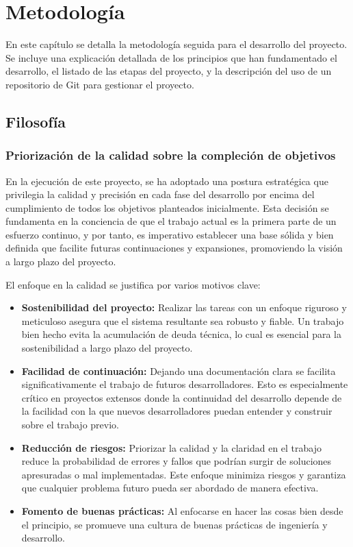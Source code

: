 \chapter{Metodología}

En este capítulo se detalla la metodología seguida para el desarrollo del proyecto. Se incluye una explicación detallada de los principios que han fundamentado el desarrollo, el listado de las etapas del proyecto, y la descripción del uso de un repositorio de Git para gestionar el proyecto.

\section{Filosofía}

\subsection{Priorización de la calidad sobre la compleción de objetivos}

En la ejecución de este proyecto, se ha adoptado una postura estratégica que privilegia la calidad y precisión en cada fase del desarrollo por encima del cumplimiento de todos los objetivos planteados inicialmente. Esta decisión se fundamenta en la conciencia de que el trabajo actual es la primera parte de un esfuerzo continuo, y por tanto, es imperativo establecer una base sólida y bien definida que facilite futuras continuaciones y expansiones, promoviendo la visión a largo plazo del proyecto.

El enfoque en la calidad se justifica por varios motivos clave:

\begin{itemize}
	\item \textbf{Sostenibilidad del proyecto:} Realizar las tareas con un enfoque riguroso y meticuloso asegura que el sistema resultante sea robusto y fiable. Un trabajo bien hecho evita la acumulación de deuda técnica, lo cual es esencial para la sostenibilidad a largo plazo del proyecto.
	
	\item \textbf{Facilidad de continuación:} Dejando una documentación clara se facilita significativamente el trabajo de futuros desarrolladores. Esto es especialmente crítico en proyectos extensos donde la continuidad del desarrollo depende de la facilidad con la que nuevos desarrolladores puedan entender y construir sobre el trabajo previo.
	
	\item \textbf{Reducción de riesgos:} Priorizar la calidad y la claridad en el trabajo reduce la probabilidad de errores y fallos que podrían surgir de soluciones apresuradas o mal implementadas. Este enfoque minimiza riesgos y garantiza que cualquier problema futuro pueda ser abordado de manera efectiva.
	
	\item \textbf{Fomento de buenas prácticas:} Al enfocarse en hacer las cosas bien desde el principio, se promueve una cultura de buenas prácticas de ingeniería y desarrollo.
	
\end{itemize}

